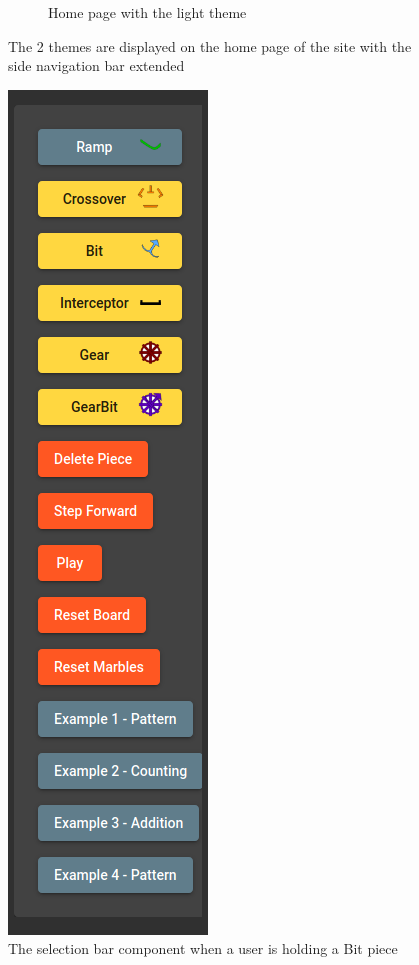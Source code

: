 \documentclass{l4proj}
\begin{document}
\begin{appendices}
\begin{figure}
\begin{subfigure}[b]{0.7\textwidth}
            \caption{Home page with the light theme}
            \label{fig:homepageLight}
        \end{subfigure}
        \caption{The 2 themes are displayed on the home page of the site with the side navigation bar extended}
        \label{fig:themes}
    \end{figure}

    \begin{figure}
    \centering
    \includegraphics[width=0.2\linewidth]{images/selectionBar.png}
    \caption{The selection bar component when a user is holding a Bit piece}
    \label{fig:selectionBar}
\end{figure}
    
\end{appendices}






\end{document}
